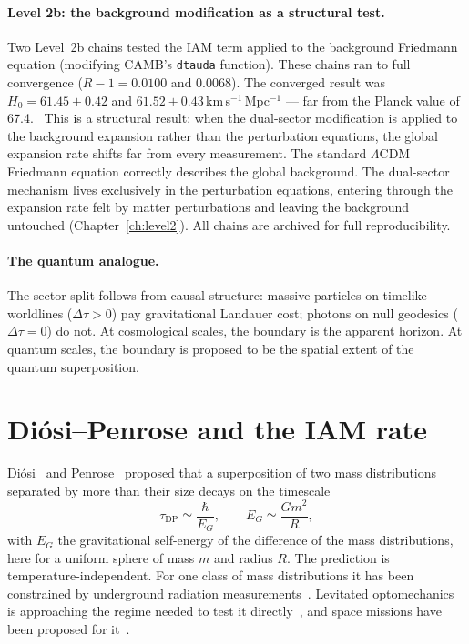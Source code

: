 \paragraph{Level 2b: the background modification as a structural test.} Two Level~2b chains tested the IAM term applied to the background Friedmann equation
(modifying CAMB's \texttt{dtauda} function). These chains ran to full convergence ($R-1=0.0100$ and $0.0068$). The converged result was
$H_0=61.45\pm0.42$ and $61.52\pm0.43$\,km\,s$^{-1}$\,Mpc$^{-1}$ --- far from the Planck value of 67.4. \measured\ This is a structural result: when the
dual-sector modification is applied to the background expansion rather than the perturbation equations, the global expansion rate shifts far from every
measurement. The standard $\Lambda$CDM Friedmann equation correctly describes the global background. The dual-sector mechanism lives exclusively in the
perturbation equations, entering through the expansion rate felt by matter perturbations and leaving the background untouched (Chapter~\ref{ch:level2}). \interp
All chains are archived for full reproducibility.

\paragraph{The quantum analogue.} The sector split follows from causal structure: massive particles on timelike worldlines ($\Delta\tau>0$) pay
gravitational Landauer cost; photons on null geodesics ($\Delta\tau=0$) do not. At cosmological scales, the boundary is the apparent horizon. At quantum
scales, the boundary is proposed to be the spatial extent of the quantum superposition. \conjecture

\section{Di\'osi--Penrose and the IAM rate}\label{sec:gd_rate}
Di\'osi~\cite{Diosi1987,Diosi1989} and Penrose~\cite{Penrose1996} proposed that a superposition of two mass distributions separated by more than their size
decays on the timescale
\begin{equation}
 \tau_{\mathrm{DP}}\simeq\frac{\hbar}{E_G},\qquad E_G\simeq\frac{Gm^2}{R},\label{eq:gd_dp}
\end{equation}
with $E_G$ the gravitational self-energy of the difference of the mass distributions, here for a uniform sphere of mass $m$ and radius $R$. The prediction
is temperature-independent. For one class of mass distributions it has been constrained by underground radiation measurements~\cite{Donadi2021}. Levitated
optomechanics is approaching the regime needed to test it directly~\cite{RomeroIsart2011,Gonzalez2021,Delic2020,Neumeier2024,Rossi2025}, and space missions
have been proposed for it~\cite{Kaltenbaek2012}. \observed

